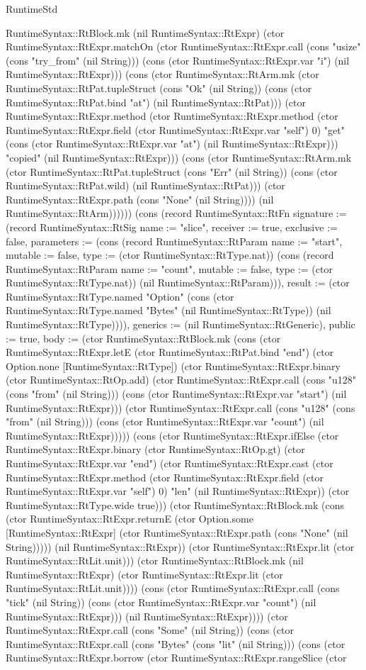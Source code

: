 \begin{lexlean}{RuntimeStd}
\begin{semanticmodule}
{RuntimeSyntax::RtBlock.mk (nil RuntimeSyntax::RtExpr) (ctor RuntimeSyntax::RtExpr.matchOn (ctor RuntimeSyntax::RtExpr.call (cons "usize" (cons "try_from" (nil String))) (cons (ctor RuntimeSyntax::RtExpr.var "i") (nil RuntimeSyntax::RtExpr))) (cons (ctor RuntimeSyntax::RtArm.mk (ctor RuntimeSyntax::RtPat.tupleStruct (cons "Ok" (nil String)) (cons (ctor RuntimeSyntax::RtPat.bind "at") (nil RuntimeSyntax::RtPat))) (ctor RuntimeSyntax::RtExpr.method (ctor RuntimeSyntax::RtExpr.method (ctor RuntimeSyntax::RtExpr.field (ctor RuntimeSyntax::RtExpr.var "self") 0) "get" (cons (ctor RuntimeSyntax::RtExpr.var "at") (nil RuntimeSyntax::RtExpr))) "copied" (nil RuntimeSyntax::RtExpr))) (cons (ctor RuntimeSyntax::RtArm.mk (ctor RuntimeSyntax::RtPat.tupleStruct (cons "Err" (nil String)) (cons (ctor RuntimeSyntax::RtPat.wild) (nil RuntimeSyntax::RtPat))) (ctor RuntimeSyntax::RtExpr.path (cons "None" (nil String)))) (nil RuntimeSyntax::RtArm)))))}) (cons (record RuntimeSyntax::RtFn {signature := (record RuntimeSyntax::RtSig {name := "slice", receiver := true, exclusive := false, parameters := (cons (record RuntimeSyntax::RtParam {name := "start", mutable := false, type := (ctor RuntimeSyntax::RtType.nat)}) (cons (record RuntimeSyntax::RtParam {name := "count", mutable := false, type := (ctor RuntimeSyntax::RtType.nat)}) (nil RuntimeSyntax::RtParam))), result := (ctor RuntimeSyntax::RtType.named "Option" (cons (ctor RuntimeSyntax::RtType.named "Bytes" (nil RuntimeSyntax::RtType)) (nil RuntimeSyntax::RtType)))}), generics := (nil RuntimeSyntax::RtGeneric), public := true, body := (ctor RuntimeSyntax::RtBlock.mk (cons (ctor RuntimeSyntax::RtExpr.letE (ctor RuntimeSyntax::RtPat.bind "end") (ctor Option.none [RuntimeSyntax::RtType]) (ctor RuntimeSyntax::RtExpr.binary (ctor RuntimeSyntax::RtOp.add) (ctor RuntimeSyntax::RtExpr.call (cons "u128" (cons "from" (nil String))) (cons (ctor RuntimeSyntax::RtExpr.var "start") (nil RuntimeSyntax::RtExpr))) (ctor RuntimeSyntax::RtExpr.call (cons "u128" (cons "from" (nil String))) (cons (ctor RuntimeSyntax::RtExpr.var "count") (nil RuntimeSyntax::RtExpr))))) (cons (ctor RuntimeSyntax::RtExpr.ifElse (ctor RuntimeSyntax::RtExpr.binary (ctor RuntimeSyntax::RtOp.gt) (ctor RuntimeSyntax::RtExpr.var "end") (ctor RuntimeSyntax::RtExpr.cast (ctor RuntimeSyntax::RtExpr.method (ctor RuntimeSyntax::RtExpr.field (ctor RuntimeSyntax::RtExpr.var "self") 0) "len" (nil RuntimeSyntax::RtExpr)) (ctor RuntimeSyntax::RtType.wide true))) (ctor RuntimeSyntax::RtBlock.mk (cons (ctor RuntimeSyntax::RtExpr.returnE (ctor Option.some [RuntimeSyntax::RtExpr] (ctor RuntimeSyntax::RtExpr.path (cons "None" (nil String))))) (nil RuntimeSyntax::RtExpr)) (ctor RuntimeSyntax::RtExpr.lit (ctor RuntimeSyntax::RtLit.unit))) (ctor RuntimeSyntax::RtBlock.mk (nil RuntimeSyntax::RtExpr) (ctor RuntimeSyntax::RtExpr.lit (ctor RuntimeSyntax::RtLit.unit)))) (cons (ctor RuntimeSyntax::RtExpr.call (cons "tick" (nil String)) (cons (ctor RuntimeSyntax::RtExpr.var "count") (nil RuntimeSyntax::RtExpr))) (nil RuntimeSyntax::RtExpr)))) (ctor RuntimeSyntax::RtExpr.call (cons "Some" (nil String)) (cons (ctor RuntimeSyntax::RtExpr.call (cons "Bytes" (cons "lit" (nil String))) (cons (ctor RuntimeSyntax::RtExpr.borrow (ctor RuntimeSyntax::RtExpr.rangeSlice (ctor }
\end{semanticmodule}
\end{lexlean}

